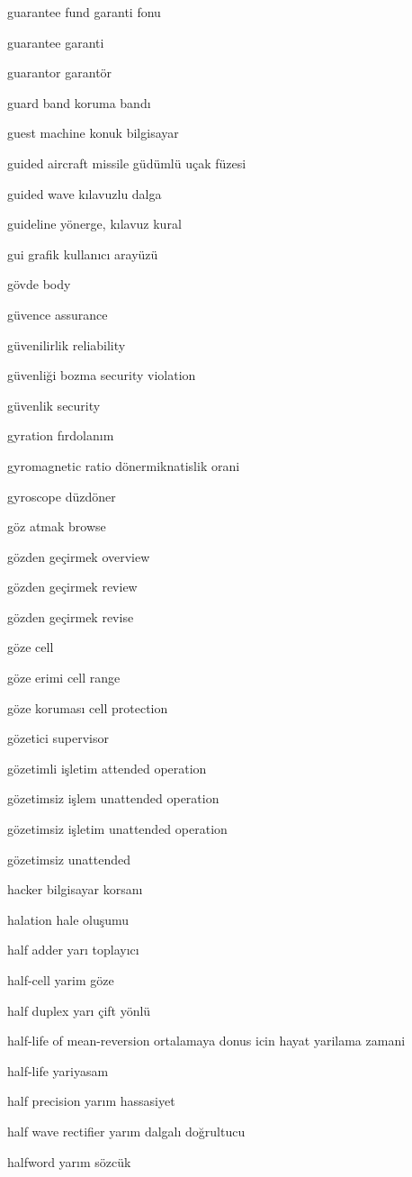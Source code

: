 \documentclass[12pt,fleqn]{article}\usepackage{../../common}
\begin{document}
guarantee fund garanti fonu

guarantee garanti

guarantor garantör

guard band koruma bandı

guest machine konuk bilgisayar

guided aircraft missile güdümlü uçak füzesi

guided wave kılavuzlu dalga

guideline yönerge, kılavuz kural

gui grafik kullanıcı arayüzü

gövde body

güvence assurance

güvenilirlik reliability

güvenliği bozma security violation

güvenlik security

gyration fırdolanım

gyromagnetic ratio dönermiknatislik orani

gyroscope düzdöner

göz atmak browse

gözden geçirmek overview

gözden geçirmek review

gözden geçirmek revise

göze cell

göze erimi cell range

göze koruması cell protection

gözetici supervisor

gözetimli işletim attended operation

gözetimsiz işlem unattended operation

gözetimsiz işletim unattended operation

gözetimsiz unattended

hacker bilgisayar korsanı

halation hale oluşumu

half adder yarı toplayıcı

half-cell yarim göze

half duplex yarı çift yönlü

half-life of mean-reversion ortalamaya donus icin hayat yarilama zamani

half-life yariyasam

half precision yarım hassasiyet

half wave rectifier yarım dalgalı doğrultucu

halfword yarım sözcük
\end{document}

